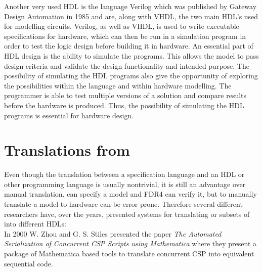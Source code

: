 Another very used HDL is the language Verilog which was published by Gateway Design Automation in 1985 and are, along with VHDL, the two main HDL's used for modelling circuits.
Verilog, as well as VHDL, is used to write executable specifications for hardware, which can then be run in a simulation program in order to test the logic design before building it in hardware. An essential part of HDL design is the ability to simulate the programs. This allows the model to pass design criteria and validate the design functionality and intended purpose. The possibility of simulating the HDL programs also give the opportunity of exploring the possibilities within the language and within hardware modelling. The programmer is able to test multiple versions of a solution and compare results before the hardware is produced. Thus, the possibility of simulating the HDL programs is essential for hardware design.


\section{Translations from \cspm{}}
Even though the translation between a specification language and an HDL or other programming language is usually nontrivial, it is still an advantage over manual translation.
\cspm{} can specify a model and FDR4 can verify it, but to manually translate a model to hardware can be error-prone. Therefore several different researchers have, over the years, presented systems for translating \cspm{} or subsets of \cspm{} into different HDLs:\\

In 2000 W. Zhou and G. S. Stiles presented the paper \textit{The Automated Serialization of Concurrent CSP Scripts using Mathematica}\cite{Zhou2000} where they present a package of Mathematica based tools to translate concurrent CSP into equivalent sequential code.

